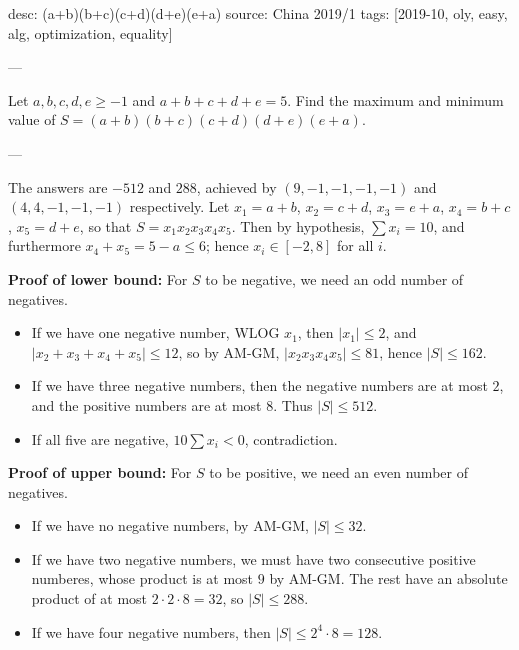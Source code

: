 desc: (a+b)(b+c)(c+d)(d+e)(e+a)
source: China 2019/1
tags: [2019-10, oly, easy, alg, optimization, equality]

---

Let $a,b,c,d,e\ge-1$ and $a+b+c+d+e=5$. Find the maximum and minimum value of $S=(a+b)(b+c)(c+d)(d+e)(e+a)$.

---

The answers are $-512$ and $288$, achieved by $(9,-1,-1,-1,-1)$ and $(4,4,-1,-1,-1)$ respectively. Let $x_1=a+b$, $x_2=c+d$, $x_3=e+a$, $x_4=b+c$, $x_5=d+e$, so that $S=x_1x_2x_3x_4x_5$. Then by hypothesis, $\sum x_i=10$, and furthermore $x_4+x_5=5-a\le6$; hence $x_i\in[-2,8]$ for all $i$.

\bigskip

\noindent\textbf{Proof of lower bound:}     For $S$ to be negative, we need an odd number of negatives.
\begin{itemize}
    \item If we have one negative number, WLOG $x_1$, then $|x_1|\le2$, and $|x_2+x_3+x_4+x_5|\le12$, so by AM-GM, $|x_2x_3x_4x_5|\le81$, hence $|S|\le162$.
    \item If we have three negative numbers, then the negative numbers are at most $2$, and the positive numbers are at most $8$. Thus $|S|\le512$.
    \item If all five are negative, $10\sum x_i<0$, contradiction.
\end{itemize}

\bigskip

\noindent\textbf{Proof of upper bound:}     For $S$ to be positive, we need an even number of negatives.
\begin{itemize}
    \item If we have no negative numbers, by AM-GM, $|S|\le32$.
    \item If we have two negative numbers, we must have two consecutive positive numberes, whose product is at most $9$ by AM-GM. The rest have an absolute product of at most $2\cdot2\cdot8=32$, so $|S|\le288$.
    \item If we have four negative numbers, then $|S|\le2^4\cdot8=128$.
\end{itemize}

